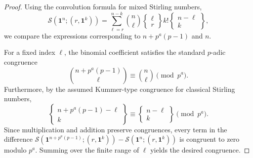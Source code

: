 \documentclass[12pt]{amsart}
\theoremstyle{definition}
\newtheorem{definition}[theorem]{Definition}
\begin{document}
\begin{proof}
Using the convolution formula for mixed Stirling numbers,
\[
\mathcal{S}(\mathbf{1}^{n};(r,\mathbf{1}^{k}))
=
\sum_{\ell=r}^{n-k}
\binom{n}{\ell}
\left\{\begin{matrix}\ell\\r\end{matrix}\right\}
k!
\left\{\begin{matrix}n-\ell\\k\end{matrix}\right\},
\]
we compare the expressions corresponding to $n+p^a(p-1)$ and $n$.

For a fixed index $\ell$, the binomial coefficient satisfies the standard $p$-adic congruence
\[
\binom{n+p^a(p-1)}{\ell}
\equiv
\binom{n}{\ell}
\pmod {p^a}.
\]
Furthermore, by the assumed Kummer-type congruence for classical Stirling numbers,
\[
\left\{\begin{matrix}
n+p^a(p-1)-\ell\\ k
\end{matrix}\right\}
\equiv
\left\{\begin{matrix}
n-\ell\\ k
\end{matrix}\right\}
\pmod {p^a}.
\]
Since multiplication and addition preserve congruences, every term in the difference $\mathcal{S}(\mathbf{1}^{n+p^a(p-1)};(r,\mathbf{1}^{k})) - \mathcal{S}(\mathbf{1}^{n};(r,\mathbf{1}^{k}))$ is congruent to zero modulo $p^a$. Summing over the finite range of $\ell$ yields the desired congruence.
\end{proof}
\end{document}
